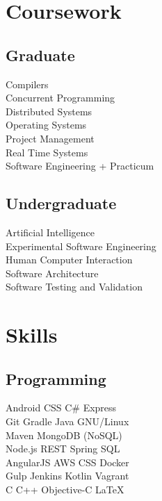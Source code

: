 \documentclass[]{resume}
\begin{document}
\begin{minipage}[t]{0.33\textwidth}
\section{Coursework}
\subsection{Graduate}
Compilers \\
Concurrent Programming \\
Distributed Systems \\
Operating Systems \\
Project Management \\
Real Time Systems \\
Software Engineering + Practicum \\
\sectionsep

\subsection{Undergraduate}
Artificial Intelligence \\
Experimental Software Engineering \\
Human Computer Interaction \\
Software Architecture \\
Software Testing and Validation \\
\sectionsep


\section{Skills}
\subsection{Programming}
Android \textbullet{} CSS \textbullet{} C\# \textbullet{} Express \\
Git \textbullet{} Gradle \textbullet{} Java \textbullet{} GNU/Linux \\
Maven \textbullet{} MongoDB (NoSQL) \\
Node.js \textbullet{} REST \textbullet{} Spring \textbullet{} SQL \\ 
\sectionsep
{}
AngularJS \textbullet{} AWS \textbullet{} CSS \textbullet{} Docker \\
Gulp \textbullet{} Jenkins \textbullet{} Kotlin \textbullet{} Vagrant \\
\sectionsep
{}
C \textbullet{} C++ \textbullet{} Objective-C \textbullet{} \LaTeX\ \\ 
\sectionsep

%
%

\end{minipage} 
\end{document}
